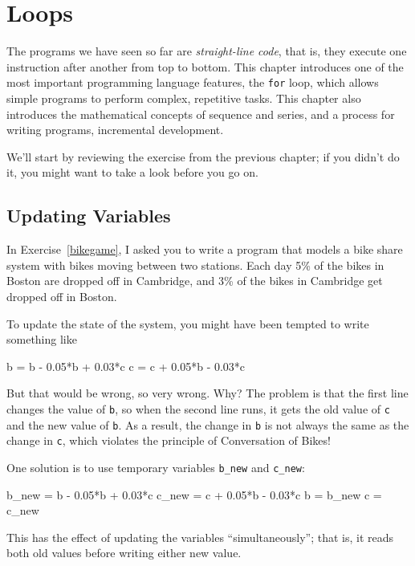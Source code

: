 
\chapter{Loops}
\minitoc{}

The programs we have seen so far are {\it straight-line code}, that is, they execute one instruction after another from top to bottom.
This chapter introduces one of the most important programming language features, the {\tt for} loop, which allows simple programs to perform complex, repetitive tasks. This chapter also introduces the mathematical concepts of sequence and series, and a process for writing programs, incremental development. 

We'll start by reviewing the exercise from the previous chapter; if you didn't do it, you might want to take a look before you go on.

\section{Updating Variables}

In Exercise~\ref{bikegame}, I asked you to write a program that models a bike share system with bikes moving between two stations.
Each day 5\% of the bikes in Boston are dropped off in Cambridge, and 3\% of the bikes
in Cambridge get dropped off in Boston.

To update the state of the system, you might have been tempted to write something
like


\begin{code}
b = b - 0.05*b + 0.03*c
c = c + 0.05*b - 0.03*c
\end{code}

But that would be wrong, so very wrong.  Why?  The problem is that
the first line changes the value of {\tt b}, so when the second line
runs, it gets the old value of {\tt c} and the new value of {\tt b}.
As a result, the change in {\tt b} is not always the same as the
change in {\tt c}, which violates the principle of Conversation
of Bikes!

One solution is to use temporary variables \verb|b_new| and \verb|c_new|:

\begin{code}
b_new = b - 0.05*b + 0.03*c
c_new = c + 0.05*b - 0.03*c
b = b_new
c = c_new
\end{code}

This has the effect of updating the variables ``simultaneously''; that
is, it reads both old values before writing either new value.

